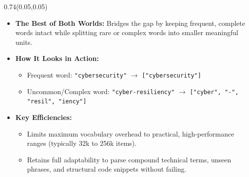 \documentclass[aspectratio=169]{beamer}
\begin{document}
	\begin{frame}{}
		\setlength{\TPHorizModule}{\textwidth}
		\setlength{\TPVertModule}{\textwidth}
		\begin{textblock}{0.74}(0.05,0.05)
			\bfseries\large{}
		\end{textblock}
		
		\vspace{2em}
		\begin{itemize}
			\item \textbf{The Best of Both Worlds:} Bridges the gap by keeping frequent, complete words intact while splitting rare or complex words into smaller meaningful units.
			\item \textbf{How It Looks in Action:} 
			\begin{itemize}
				\item Frequent word: \texttt{"cybersecurity"} $\rightarrow$ \texttt{["cybersecurity"]}
				\item Uncommon/Complex word: \texttt{"cyber-resiliency"} $\rightarrow$ \texttt{["cyber", "-", "resil", "iency"]}
			\end{itemize}
			\item \textbf{Key Efficiencies:}
			\begin{itemize}
				\item Limits maximum vocabulary overhead to practical, high-performance ranges (typically 32k to 256k items).
				\item Retains full adaptability to parse compound technical terms, unseen phrases, and structural code snippets without failing.
			\end{itemize}
		\end{itemize}
	\end{frame}
	
\end{document}

